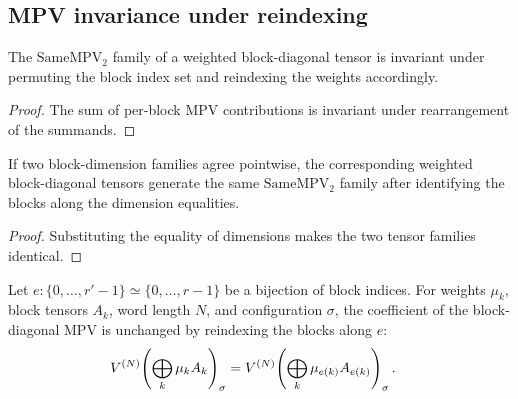 \subsection{MPV invariance under reindexing}%
\label{subsec:mpv_reindexing}

\begin{lemma}\label{lem:mpv_perm_blocks}
    \leanok
    The $\mathrm{SameMPV}_2$ family of a weighted block-diagonal tensor is
    invariant under permuting the block index set and reindexing the weights
    accordingly.
\end{lemma}

\begin{proof}\leanok
    The sum of per-block MPV contributions is invariant under rearrangement
    of the summands.
\end{proof}

\begin{lemma}\label{lem:mpv_cast_blocks}
    \leanok
    If two block-dimension families agree pointwise, the corresponding
    weighted block-diagonal tensors generate the same $\mathrm{SameMPV}_2$
    family after identifying the blocks along the dimension equalities.
\end{lemma}

\begin{proof}\leanok
    Substituting the equality of dimensions makes the two tensor families
    identical.
\end{proof}

\begin{lemma}\label{lem:mpv_reindex_blocks}
    \leanok
    Let $e : \{0,\ldots,r'-1\}\simeq\{0,\ldots,r-1\}$ be a bijection of block
    indices. For weights $\mu_k$, block tensors $A_k$, word length $N$, and
    configuration $\sigma$, the coefficient of the block-diagonal MPV is unchanged
    by reindexing the blocks along $e$:
    \begin{align}
        V^{(N)}\!\left(\bigoplus_k \mu_k A_k\right)_\sigma
         & =
        V^{(N)}\!\left(\bigoplus_k \mu_{e(k)} A_{e(k)}\right)_\sigma.
        \notag
    \end{align}
\end{lemma}

